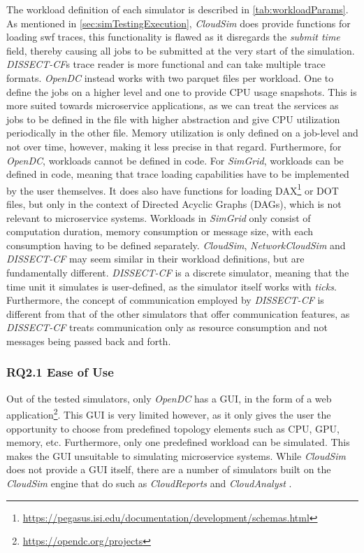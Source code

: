 The workload definition of each simulator is described in \autoref{tab:workloadParams}. As mentioned in \autoref{sec:simTestingExecution}, \textit{CloudSim} does provide functions for loading swf traces, this functionality is flawed as it disregards the \textit{submit time} field, thereby causing all jobs to be submitted at the very start of the simulation. \textit{DISSECT-CF}s trace reader is more functional and can take multiple trace formats. \textit{OpenDC} instead works with two parquet files per workload. One to define the jobs on a higher level and one to provide CPU usage snapshots. This is more suited towards microservice applications, as we can treat the services as jobs to be defined in the file with higher abstraction and give CPU utilization periodically in the other file. Memory utilization is only defined on a job-level and not over time, however, making it less precise in that regard. Furthermore, for \textit{OpenDC}, workloads cannot be defined in code. For \textit{SimGrid}, workloads can be defined in code, meaning that trace loading capabilities have to be implemented by the user themselves. It does also have functions for loading DAX\footnote{\url{https://pegasus.isi.edu/documentation/development/schemas.html}} or DOT files, but only in the context of Directed Acyclic Graphs (DAGs), which is not relevant to microservice systems. Workloads in \textit{SimGrid} only consist of computation duration, memory consumption or message size, with each consumption having to be defined separately. \textit{CloudSim}, \textit{NetworkCloudSim} and \textit{DISSECT-CF} may seem similar in their workload definitions, but are fundamentally different. \textit{DISSECT-CF} is a discrete simulator, meaning that the time unit it simulates is user-defined, as the simulator itself works with \textit{ticks}. Furthermore, the concept of communication employed by \textit{DISSECT-CF} is different from that of the other simulators that offer communication features, as \textit{DISSECT-CF} treats communication only as resource consumption and not messages being passed back and forth.

\subsubsection{RQ2.1 Ease of Use}
Out of the tested simulators, only \textit{OpenDC} has a GUI, in the form of a web application\footnote{\url{https://opendc.org/projects}}. This GUI is very limited however, as it only gives the user the opportunity to choose from predefined topology elements such as CPU, GPU, memory, etc. Furthermore, only one predefined workload can be simulated. This makes the GUI unsuitable to simulating microservice systems. While \textit{CloudSim} does not provide a GUI itself, there are a number of simulators built on the \textit{CloudSim} engine that do such as \textit{CloudReports} \cite{teixeira_sa_cloudreports_2014} and \textit{CloudAnalyst} \cite{wickremasinghe_cloudanalyst_2010}.

